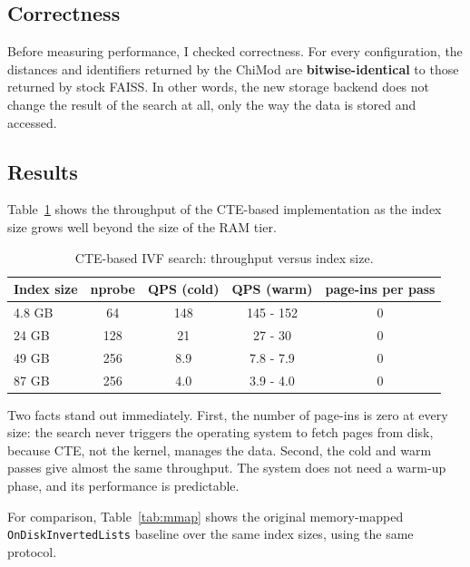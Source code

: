 \documentclass[11pt]{article}
\begin{document}
\subsection{Correctness}

Before measuring performance, I checked correctness. For every
configuration, the distances and identifiers returned by the ChiMod
are \textbf{bitwise-identical} to those returned by stock FAISS. In
other words, the new storage backend does not change the result of
the search at all, only the way the data is stored and accessed.

\subsection{Results}

Table~\ref{tab:qps} shows the throughput of the CTE-based
implementation as the index size grows well beyond the size of the
RAM tier.

\begin{table}[h]
\centering
\begin{tabular}{lcccc}
\toprule
Index size & nprobe & QPS (cold) & QPS (warm) & page-ins per pass \\
\midrule
4.8 GB  & 64  & 148 & 145 - 152 & 0 \\
24 GB   & 128 & 21  & 27 - 30   & 0 \\
49 GB   & 256 & 8.9 & 7.8 - 7.9 & 0 \\
87 GB   & 256 & 4.0 & 3.9 - 4.0 & 0 \\
\bottomrule
\end{tabular}
\caption{CTE-based IVF search: throughput versus index size.}
\label{tab:qps}
\end{table}

Two facts stand out immediately. First, the number of page-ins is
zero at every size: the search never triggers the operating system to
fetch pages from disk, because CTE, not the kernel, manages the data.
Second, the cold and warm passes give almost the same throughput. The
system does not need a warm-up phase, and its performance is
predictable.

For comparison, Table~\ref{tab:mmap} shows the original memory-mapped
\texttt{OnDiskInvertedLists} baseline over the same index sizes, using
the same protocol.
\end{document}
